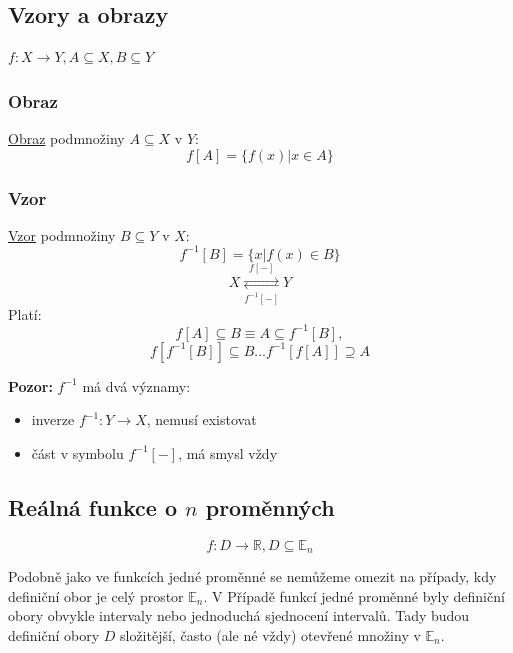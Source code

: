 \documentclass[../main.tex]{subfiles}
\begin{document}
\subsection{Vzory a obrazy}
\hspace{1.2mm}
$f: X \rightarrow Y, A \subseteq X, B \subseteq Y$
\subsubsection{Obraz}
\hspace{1.2mm}
\underline{Obraz} podmnožiny $A\subseteq X$ v $Y$:
\[f[A] = \{f(x) | x \in A\}\]

\subsubsection{Vzor}
\hspace{1.2mm}
\underline{Vzor} podmnožiny $B\subseteq Y$ v $X$:
\[f^{-1}[B] = \{x | f(x) \in B\}\]
\[X \underset{f^{-1}[-]}{\stackrel{f[-]}{\rightleftarrows}} Y\]
\hspace{1.2mm}
Platí:
\[f[A] \subseteq B \equiv A \subseteq f^{-1}[B],\]
\[f[f^{-1}[B]] \subseteq B  ...  f^{-1}[f[A]] \supseteq A\]

\noindent
\hspace{1.2mm}
\textbf{Pozor:} $f^{-1}$ má dvá významy:
\begin{itemize}
    \item inverze $f^{-1}:Y \rightarrow X$, nemusí existovat
    \item část v symbolu $f^{-1}[-]$, má smysl vždy
 
\end{itemize}
\noindent

\subsection{Reálná funkce o $n$ proměnných}
\hspace{1.2mm}
\[f: D \rightarrow \mathbb{R}, D \subseteq \mathbb{E}_n\]

\noindent
\hspace{1.2mm}
Podobně jako ve funkcích jedné proměnné se nemůžeme omezit na případy, kdy definiční obor je celý prostor $\mathbb{E}_n$. V 
Případě funkcí jedné proměnné byly definiční obory obvykle intervaly nebo jednoduchá sjednocení intervalů. Tady budou definiční
obory $D$ složitější, často (ale né vždy) otevřené množiny v $\mathbb{E}_n$.
\end{document}
